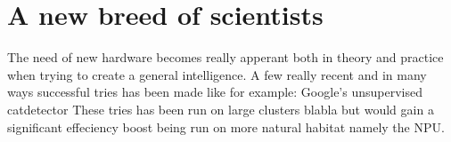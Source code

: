 \documentclass{article}
\begin{document}
\section{A new breed of scientists}
    The need of new hardware becomes really apperant both in
    theory and practice when trying to create a general intelligence.
    A few really recent and in many ways successful tries has been made
    like for example: Google's unsupervised catdetector %
    These tries has been run on large clusters blabla but would gain a
    significant effeciency boost being run on more natural habitat namely the
    NPU. 


    
    
\end{document}

